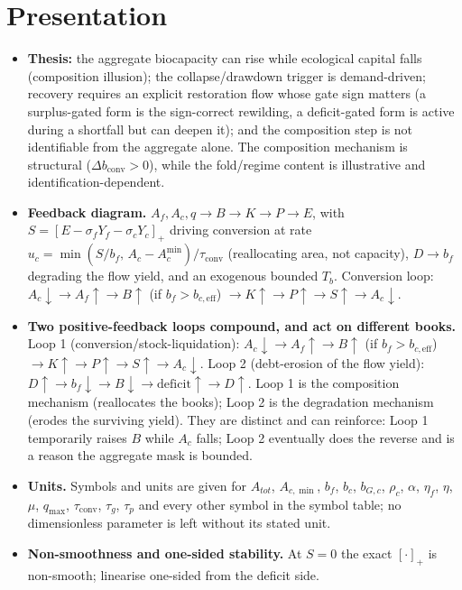\documentclass[11pt]{article}
\begin{document}
\section{Presentation}

\begin{itemize}
\item \textbf{Thesis:} the aggregate biocapacity can rise while ecological capital falls (composition illusion); the collapse/drawdown trigger is demand-driven; recovery requires an explicit restoration flow whose gate sign matters (a surplus-gated form is the sign-correct rewilding, a deficit-gated form is active during a shortfall but can deepen it); and the composition step is not identifiable from the aggregate alone. The composition mechanism is structural ($\Delta b_{\mathrm{conv}}>0$), while the fold/regime content is illustrative and identification-dependent.
\item \textbf{Feedback diagram.} $A_f,A_c,q\to B\to K\to P\to E$, with $S=[E-\sigma_fY_f-\sigma_cY_c]_+$ driving conversion at rate $u_c=\min(S/b_f,\,A_c-A_c^{\min})/\tau_{\mathrm{conv}}$ (reallocating area, not capacity), $D\to b_f$ degrading the flow yield, and an exogenous bounded $T_b$. Conversion loop: $A_c\!\downarrow\!\to A_f\!\uparrow\!\to B\!\uparrow\!$ (if $b_f>b_{c,\mathrm{eff}}$) $\!\to\!K\!\uparrow\!\to\!P\!\uparrow\!\to\!S\!\uparrow\!\to\!A_c\!\downarrow$.
\item \textbf{Two positive-feedback loops compound, and act on different books.} Loop 1 (conversion/stock-liquidation): $A_c\!\downarrow\!\to A_f\!\uparrow\!\to B\!\uparrow$ (if $b_f>b_{c,\mathrm{eff}}$) $\to K\!\uparrow\!\to P\!\uparrow\!\to S\!\uparrow\!\to A_c\!\downarrow$. Loop 2 (debt-erosion of the flow yield): $D\!\uparrow\!\to b_f\!\downarrow\!\to B\!\downarrow\!\to\mathrm{deficit}\!\uparrow\!\to D\!\uparrow$. Loop 1 is the composition mechanism (reallocates the books); Loop 2 is the degradation mechanism (erodes the surviving yield). They are distinct and can reinforce: Loop 1 temporarily raises $B$ while $A_c$ falls; Loop 2 eventually does the reverse and is a reason the aggregate mask is bounded.
\item \textbf{Units.} Symbols and units are given for $A_{tot}$, $A_{c,\min}$, $b_f$, $b_c$, $b_{G,c}$, $\rho_c$, $\alpha$, $\eta_f$, $\eta$, $\mu$, $q_{\max}$, $\tau_{\mathrm{conv}}$, $\tau_g$, $\tau_p$ and every other symbol in the symbol table; no dimensionless parameter is left without its stated unit.
\item \textbf{Non-smoothness and one-sided stability.} At $S=0$ the exact $[\cdot]_+$ is non-smooth; linearise one-sided from the deficit side.

\end{itemize}
\end{document}

